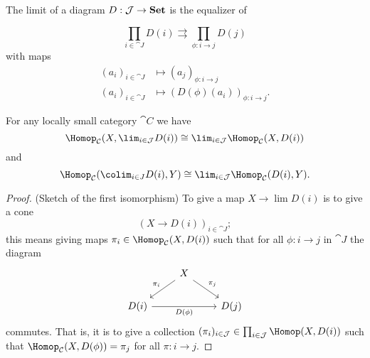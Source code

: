 \documentclass[../main.tex]{subfiles}
\begin{document}
\begin{rmk}
	The limit of a diagram $D: \mathcal{J} \to \mathbf{Set}$ is the equalizer of 

	\[
		\prod_{i \in \cat J} D(i) \rightrightarrows \prod_{\phi: i \to j} D(j)
	\]
	with maps 
	\begin{align*}
		(a_i)_{i \in \cat J} & \mapsto (a_j)_{\phi: i \to j} \\
		(a_i)_{i \in \cat J} & \mapsto (D(\phi)(a_i))_{\phi: i \to j}.
	\end{align*}
\end{rmk}


\begin{cor}
	For any locally small category $\cat C$ we have 
    \[
        \Hom_{\cat C}(X, \lim_{i \in \cat J}D(i)) \cong \lim_{i \in \cat J} \Hom_{\cat C}(X, D(i))
    \] and 
    \[
         \Hom_{\cat C}(\colim_{i \in J} D(i), Y) \cong \lim_{i \in \cat J} \Hom_{\cat C}(D(i), Y).   
    \]
\end{cor}
\begin{proof}(Sketch of the first isomorphism)
To give a map $X \to \lim D(i)$ is to give a cone $$(X \to D(i))_{i \in \cat J};$$ this means giving maps $\pi_i \in \Hom_{\cat C}(X, D(i))$ such that for all $\phi: i \to j$ in $\cat J$ the diagram 
\[\begin{tikzcd}
                            & X \arrow[ld, "\pi_i"'] \arrow[rd, "\pi_j"] &      \\
D(i) \arrow[rr, "D(\phi)"'] &                                            & D(j)
\end{tikzcd}\] commutes. That is, it is to give a collection $(\pi_i)_{i \in \cat J} \in \prod_{i \in \cat J} \Hom(X, D(i))$ such that $\Hom_{\cat C}(X, D(\phi)) = \pi_j$ for all $\pi: i \to j$. 
	
\end{proof}
\end{document}
